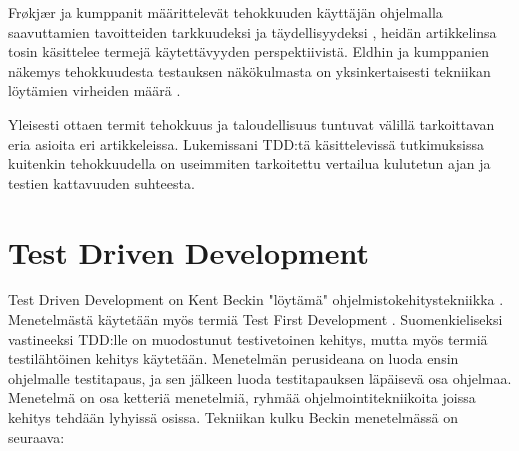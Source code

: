 \documentclass[finnish]{tktltiki2}
\theoremstyle{definition}
\theoremstyle{remark}
\begin{document}
Frøkjær ja kumppanit määrittelevät tehokkuuden käyttäjän ohjelmalla saavuttamien tavoitteiden tarkkuudeksi ja täydellisyydeksi \cite{Frokjaer00}, heidän artikkelinsa tosin käsittelee termejä käytettävyyden perspektiivistä. Eldhin ja kumppanien näkemys tehokkuudesta testauksen näkökulmasta on yksinkertaisesti tekniikan löytämien virheiden määrä \cite{Eldh06}.



Yleisesti ottaen termit tehokkuus ja taloudellisuus tuntuvat välillä tarkoittavan eria asioita eri artikkeleissa. Lukemissani TDD:tä käsittelevissä tutkimuksissa kuitenkin tehokkuudella on useimmiten tarkoitettu vertailua kulutetun ajan ja testien kattavuuden suhteesta. 





\section{Test Driven Development}


Test Driven Development on Kent Beckin "löytämä" ohjelmistokehitystekniikka \cite{Beck03}. Menetelmästä käytetään myös termiä Test First Development \cite{Crispin06}. Suomenkieliseksi vastineeksi TDD:lle on muodostunut testivetoinen kehitys, mutta myös termiä testilähtöinen kehitys käytetään. Menetelmän perusideana on luoda ensin ohjelmalle testitapaus, ja sen jälkeen luoda testitapauksen läpäisevä osa ohjelmaa. Menetelmä on osa ketteriä menetelmiä, ryhmää ohjelmointitekniikoita joissa kehitys tehdään lyhyissä osissa. Tekniikan kulku Beckin menetelmässä on seuraava:
\end{document}
